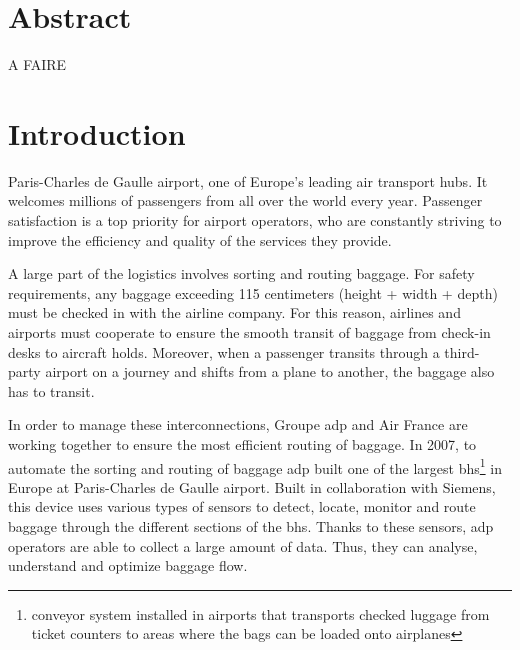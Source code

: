 \documentclass[12pt]{article}
\begin{document}
\newpage






\newpage

\renewcommand{\contentsname}{Table of contents}\tableofcontents

\newpage
\listoffigures
\listoftables



\newpage
\section*{Abstract}
\label{Abstract}
A FAIRE



\newpage
\section*{Introduction}
\label{introduction}

Paris-Charles de Gaulle airport, one of Europe's leading air transport hubs. It welcomes millions of passengers from all over the world every year. Passenger satisfaction is a top priority for airport operators, who are constantly striving to improve the efficiency and quality of the services they provide.  \hfill \break


A large part of the logistics involves sorting and routing baggage. For safety requirements, any baggage exceeding 115 centimeters (height + width + depth) must be checked in with the airline company. For this reason, airlines and airports must cooperate to ensure the smooth transit of baggage from check-in desks to aircraft holds. Moreover, when a passenger transits through a third-party airport on a journey and shifts from a plane to another, the baggage also has to transit. \hfill \break


In order to manage these interconnections, Groupe \acrshort{adp} and Air France are working together to ensure the most efficient routing of baggage. In 2007, to automate the sorting and routing of baggage  \acrshort{adp}  built one of the largest \acrfull{bhs}\footnote{conveyor system installed in airports that transports checked luggage from ticket counters to areas where the bags can be loaded onto airplanes} in Europe at Paris-Charles de Gaulle airport. Built in collaboration with Siemens, this device uses various types of sensors to detect, locate, monitor and route baggage through the different sections of the \acrshort{bhs}. Thanks to these sensors, \acrshort{adp} operators are able to collect a large amount of data. Thus, they can analyse, understand and optimize baggage flow.  \hfill \break
\end{document}
